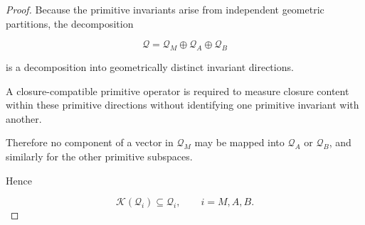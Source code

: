 \documentclass[11pt]{article}
\theoremstyle{definition}
\theoremstyle{remark}
\begin{document}
\begin{proof}

Because the primitive invariants arise from independent
geometric partitions, the decomposition

\begin{equation}
\mathcal Q
=
\mathcal Q_M
\oplus
\mathcal Q_A
\oplus
\mathcal Q_B
\end{equation}

is a decomposition into geometrically distinct invariant
directions.

A closure-compatible primitive operator is required to measure
closure content within these primitive directions without
identifying one primitive invariant with another.

Therefore no component of a vector in
\(\mathcal Q_M\) may be mapped into
\(\mathcal Q_A\) or \(\mathcal Q_B\), and similarly for the
other primitive subspaces.

Hence

\begin{equation}
\mathcal K(\mathcal Q_i)
\subseteq
\mathcal Q_i,
\qquad
i=M,A,B.
\end{equation}

\end{proof}

\end{document}

